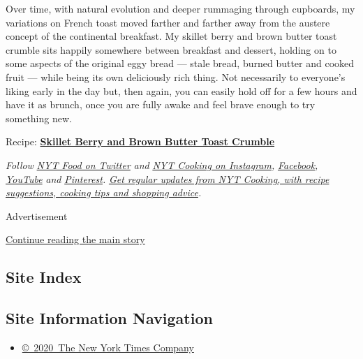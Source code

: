 Over time, with natural evolution and deeper rummaging through
cupboards, my variations on French toast moved farther and farther away
from the austere concept of the continental breakfast. My skillet berry
and brown butter toast crumble sits happily somewhere between breakfast
and dessert, holding on to some aspects of the original eggy bread ---
stale bread, burned butter and cooked fruit --- while being its own
deliciously rich thing. Not necessarily to everyone's liking early in
the day but, then again, you can easily hold off for a few hours and
have it as brunch, once you are fully awake and feel brave enough to try
something new.

Recipe:
\textbf{\href{https://cooking.nytimes.com/recipes/1021208-skillet-berry-and-brown-butter-toast-crumble}{Skillet
Berry and Brown Butter Toast Crumble}}

\emph{Follow} \href{https://twitter.com/nytfood}{\emph{NYT Food on
Twitter}} \emph{and}
\href{https://www.instagram.com/nytcooking/}{\emph{NYT Cooking on
Instagram}}\emph{,}
\href{https://www.facebook.com/nytcooking/}{\emph{Facebook}}\emph{,}
\href{https://www.youtube.com/nytcooking}{\emph{YouTube}} \emph{and}
\href{https://www.pinterest.com/nytcooking/}{\emph{Pinterest}}\emph{.}
\href{https://www.nytimes.com/newsletters/cooking}{\emph{Get regular
updates from NYT Cooking, with recipe suggestions, cooking tips and
shopping advice}}\emph{.}

Advertisement

\protect\hyperlink{after-bottom}{Continue reading the main story}

\hypertarget{site-index}{%
\subsection{Site Index}\label{site-index}}

\hypertarget{site-information-navigation}{%
\subsection{Site Information
Navigation}\label{site-information-navigation}}

\begin{itemize}
\tightlist
\item
  \href{https://help.nytimes.com/hc/en-us/articles/115014792127-Copyright-notice}{©~2020~The
  New York Times Company}
\end{itemize}

